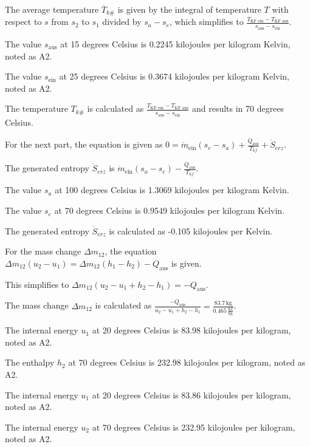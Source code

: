 The average temperature \( \overline{T}_{k\#} \) is given by the integral of temperature \( T \) with respect to \( s \) from \( s_2 \) to \( s_1 \) divided by \( s_a - s_e \), which simplifies to \( \frac{T_{\text{KF ein}} - T_{\text{KF aus}}}{s_{\text{aus}} - s_{\text{ein}}} \).

The value \( s_{\text{aus}} \) at 15 degrees Celsius is 0.2245 kilojoules per kilogram Kelvin, noted as A2.

The value \( s_{\text{ein}} \) at 25 degrees Celsius is 0.3674 kilojoules per kilogram Kelvin, noted as A2.

The temperature \( T_{k\#} \) is calculated as \( \frac{T_{\text{KF ein}} - T_{\text{KF aus}}}{s_{\text{aus}} - s_{\text{ein}}} \) and results in 70 degrees Celsius.

For the next part, the equation is given as \( 0 = \dot{m}_{\text{ein}} (s_e - s_a) + \frac{\dot{Q}_{\text{aus}}}{T_{kf}} + \dot{S}_{erz} \).

The generated entropy \( \dot{S}_{erz} \) is \( \dot{m}_{\text{ein}} (s_a - s_e) - \frac{\dot{Q}_{\text{aus}}}{T_{kf}} \).

The value \( s_a \) at 100 degrees Celsius is 1.3069 kilojoules per kilogram Kelvin.

The value \( s_e \) at 70 degrees Celsius is 0.9549 kilojoules per kilogram Kelvin.

The generated entropy \( \dot{S}_{erz} \) is calculated as -0.105 kilojoules per Kelvin.

For the mass change \( \Delta m_{12} \), the equation \( \Delta m_{12} (u_2 - u_1) = \Delta m_{12} (h_1 - h_2) - Q_{\text{aus}} \) is given.

This simplifies to \( \Delta m_{12} \left( u_2 - u_1 + h_2 - h_1 \right) = -Q_{\text{aus}} \).

The mass change \( \Delta m_{12} \) is calculated as \( \frac{-Q_{\text{aus}}}{u_2 - u_1 + h_2 - h_1} = \frac{83.7 \, \text{kg}}{0.465 \, \frac{\text{kJ}}{\text{kg}}} \).

The internal energy \( u_1 \) at 20 degrees Celsius is 83.98 kilojoules per kilogram, noted as A2.

The enthalpy \( h_2 \) at 70 degrees Celsius is 232.98 kilojoules per kilogram, noted as A2.

The internal energy \( u_1 \) at 20 degrees Celsius is 83.86 kilojoules per kilogram, noted as A2.

The internal energy \( u_2 \) at 70 degrees Celsius is 232.95 kilojoules per kilogram, noted as A2.